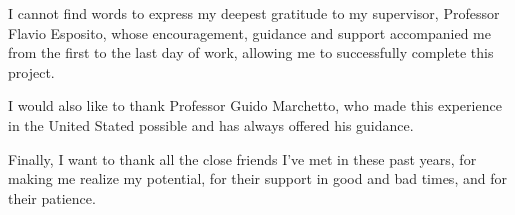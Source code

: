 \cleardoublepage
\begin{ringraziamenti}
I cannot find words to express my deepest gratitude to my supervisor, Professor Flavio Esposito, whose encouragement, guidance and support accompanied me from the first to the last day of work, allowing me to successfully complete this project.

I would also like to thank Professor Guido Marchetto, who made this experience in the United Stated possible and has always offered his guidance.

Finally, I want to thank all the close friends I've met in these past years, for making me realize my potential, for their support in good and bad times, and for their patience.
\end{ringraziamenti}